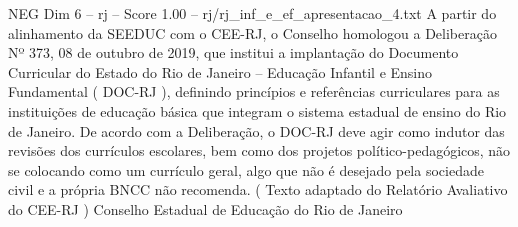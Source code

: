 \begin{textsample}{NEG Dim 6 – rj – Score 1.00 – rj/rj\_inf\_e\_ef\_apresentacao\_4.txt}
A partir do alinhamento da SEEDUC com o CEE-RJ, o Conselho homologou a Deliberação Nº 373, 08 de outubro de 2019, que institui a implantação do Documento Curricular do Estado do Rio de Janeiro – Educação Infantil e Ensino Fundamental ( DOC-RJ ), definindo princípios e referências curriculares para as instituições de educação básica que integram o sistema estadual de ensino do Rio de Janeiro.
De acordo com a Deliberação, o DOC-RJ deve agir como indutor das revisões dos currículos escolares, bem como dos projetos político-pedagógicos, não se colocando como um currículo geral, algo que não é desejado pela sociedade civil e a própria BNCC não recomenda. ( Texto adaptado do Relatório Avaliativo do CEE-RJ ) Conselho Estadual de Educação do Rio de Janeiro

\end{textsample}
